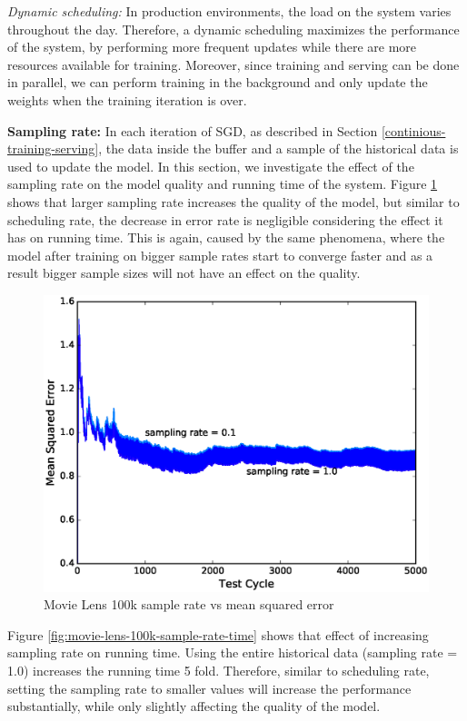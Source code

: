 \documentclass{sig-alternate-05-2015}
\begin{document}
\textit{Dynamic scheduling:} In production environments, the load on the system varies throughout the day. 
Therefore, a dynamic scheduling maximizes the performance of the system, by performing more frequent updates while there are more resources available for training. 
Moreover, since training and serving can be done in parallel, we can perform training in the background and only update the weights when the training iteration is over. 

\textbf{Sampling rate:} In each iteration of SGD, as described in Section \ref{continious-training-serving}, the data inside the buffer and a sample of the historical data is used to update the model.
In this section, we investigate the effect of the sampling rate on the model quality and running time of the system.
Figure \ref{fig:movie-lens-100k-sample-rate} shows that larger sampling rate increases the quality of the model, but similar to scheduling rate, the decrease in error rate is negligible considering the effect it has on running time. 
This is again, caused by the same phenomena, where the model after training on bigger sample rates start to converge faster and as a result bigger sample sizes will not have an effect on the quality.
 
\begin{figure}[!ht]
\centering
\includegraphics[width=\columnwidth]{../images/experiment-results/movie-lens-100k-sampling-rate.eps}
\caption{Movie Lens 100k sample rate vs mean squared error}
\label{fig:movie-lens-100k-sample-rate}
\end{figure}

Figure \ref{fig:movie-lens-100k-sample-rate-time} shows that effect of increasing sampling rate on running time.
Using the entire historical data (sampling rate = 1.0) increases the running time 5 fold. 
Therefore, similar to scheduling rate, setting the sampling rate to smaller values will increase the performance substantially, while only slightly affecting the quality of the model.
\end{document}
